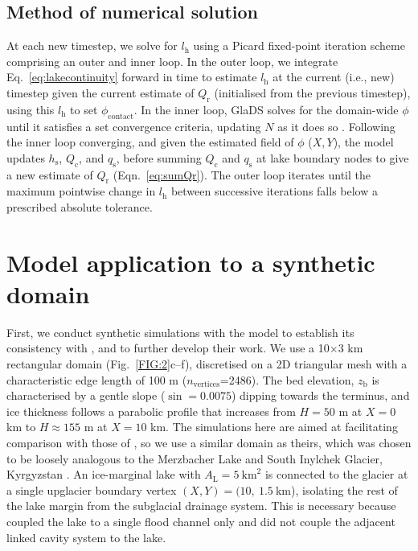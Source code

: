 \documentclass[tc, manuscript]{copernicus}
\begin{document}
\subsection{Method of numerical solution}\label{methods:Numeric}

At each new timestep, we solve for $l_{\mathrm{h}}$ using a Picard fixed-point iteration scheme comprising an outer and inner loop. In the outer loop, we integrate Eq.~\ref{eq:lakecontinuity} forward in time to estimate $l_{\mathrm{h}}$ at the current (i.e., new) timestep given the current estimate of $Q_{\mathrm{r}}$ (initialised from the previous timestep), using this $l_{\mathrm{h}}$ to set $\phi_{\mathrm{contact}}$. In the inner loop, GlaDS solves for the domain-wide $\phi$ until it satisfies a set convergence criteria, updating $N$ as it does so \citep{werder2013modeling,hill2024improved}. Following the inner loop converging, and given the estimated field of $\phi$ ($X,Y$), the model updates $h_{\mathrm{s}}$, $Q_{\mathrm{c}}$, and $q_{\mathrm{s}}$, before summing $Q_{\mathrm{c}}$ and $q_{\mathrm{s}}$ at lake boundary nodes to give a new estimate of $Q_{\mathrm{r}}$ (Eqn.~\ref{eq:sumQr}). The outer loop iterates until the maximum pointwise change in $l_{\mathrm{h}}$ between successive iterations falls below a prescribed absolute tolerance.


\section{Model application to a synthetic domain}\label{application:synth}

First, we conduct synthetic simulations with the model to establish its consistency with \citet{kingslake2013modelling}, and to further develop their work. We use a 10$\times$3 km rectangular domain (Fig.~\ref{FIG:2}c--f), discretised on a 2D triangular mesh with a characteristic edge length of 100 m ($n_{\mathrm{vertices}}$=2486). The bed elevation, $z_{\mathrm{b}}$ is characterised by a gentle slope ($\sin=0.0075$) dipping towards the terminus, and ice thickness follows a parabolic profile that increases from $H=50$ m at $X=0$ km to $H\approx155$ m at $X = 10$ km. The simulations here are aimed at facilitating comparison with those of \citet{kingslake2013modelling}, so we use a similar domain as theirs, which was chosen to be loosely analogous to the Merzbacher Lake and South Inylchek Glacier, Kyrgyzstan \citep{ng2009temporal}. An ice-marginal lake with $A_{\mathrm{L}}=5\ \mathrm{km}^{2}$ is connected to the glacier at a single upglacier boundary vertex $(X, Y) = (10,\ 1.5\ \text{km}$), isolating the rest of the lake margin from the subglacial drainage system. This is necessary because \citet{kingslake2013modelling} coupled the lake to a single flood channel only and did not couple the adjacent linked cavity system to the lake. 
\end{document}
